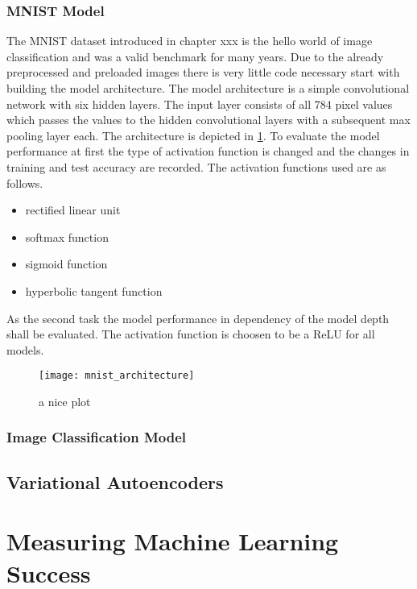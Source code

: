 \documentclass{scrreprt}
\begin{document}
\subsection{MNIST Model}
The MNIST dataset introduced in chapter xxx is the hello world of image classification and was a valid benchmark for many years. Due to the already preprocessed and preloaded images there is very little code necessary start with building the model architecture. The model architecture is a simple convolutional network with six hidden layers. The input layer consists of all 784 pixel values which passes the values to the hidden convolutional layers with a subsequent max pooling layer each. The architecture is depicted in \ref{fig:mnist_architecture}. To evaluate the model performance at first the type of activation function is changed and the changes in training and test accuracy are recorded. The activation functions used are as follows.

\begin{itemize}
\item rectified linear unit
\item softmax function
\item sigmoid function
\item hyperbolic tangent function
\end{itemize}

As the second task the model performance in dependency of the model depth shall be evaluated. The activation function is choosen to be a ReLU for all models.

\begin{figure}[h]
\centering
\texttt{[image: mnist\_architecture]}
\caption{a nice plot}
\label{fig:mnist_architecture}
\end{figure}




\subsection{Image Classification Model}

\section{Variational Autoencoders}


\chapter{Measuring Machine Learning Success}
\end{document}

